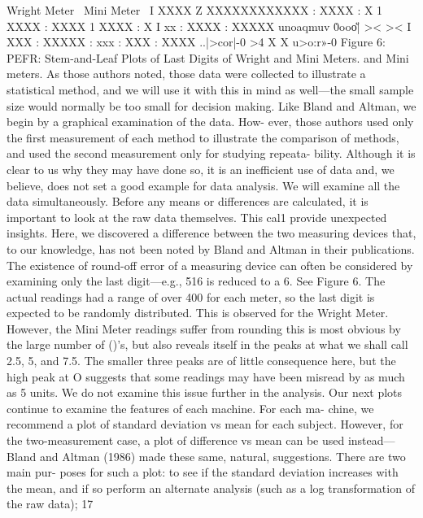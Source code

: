 Wright Meter \ Mini Meter \
I XXXX Z XXXXXXXXXXXX
: XXXX : X
1 XXXX : XXXX
1 XXXX : X
I xx
: XXXX : XXXXX
unoaqmuv
\.0oo\|o\u|
>< ><
I XXX
: XXXXX : xxx
: XXX : XXXX
..|>cor\>|-0
>4 X
X
u>o:r\>»-0
Figure 6: PEFR: Stem-and-Leaf Plots of Last Digits of Wright and Mini Meters.
and Mini meters. As those authors noted, those data were collected to illustrate a
statistical method, and we will use it with this in mind as well—the small sample size
would normally be too small for decision making.
Like Bland and Altman, we begin by a graphical examination of the data. How-
ever, those authors used only the ﬁrst measurement of each method to illustrate the
comparison of methods, and used the second measurement only for studying repeata-
bility. Although it is clear to us why they may have done so, it is an inefficient use of
data and, we believe, does not set a good example for data analysis. We will examine
all the data simultaneously.
Before any means or differences are calculated, it is important to look at the
raw data themselves. This cal1 provide unexpected insights. Here, we discovered a
difference between the two measuring devices that, to our knowledge, has not been
noted by Bland and Altman in their publications. The existence of round-off error
of a measuring device can often be considered by examining only the last digit—e.g.,
516 is reduced to a 6. See Figure 6.
The actual readings had a range of over 400 for each meter, so the last digit
is expected to be randomly distributed. This is observed for the Wright Meter.
However, the Mini Meter readings suffer from rounding this is most obvious by the
large number of ()’s, but also reveals itself in the peaks at what we shall call 2.5, 5,
and 7.5. The smaller three peaks are of little consequence here, but the high peak at
O suggests that some readings may have been misread by as much as 5 units. We do
not examine this issue further in the analysis.
Our next plots continue to examine the features of each machine. For each ma-
chine, we recommend a plot of standard deviation vs mean for each subject. However,
for the two-measurement case, a plot of difference vs mean can be used instead—Bland
and Altman (1986) made these same, natural, suggestions. There are two main pur-
poses for such a plot: to see if the standard deviation increases with the mean, and
if so perform an alternate analysis (such as a log transformation of the raw data);
17



